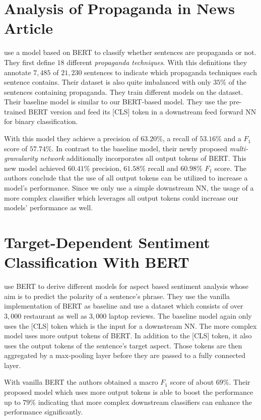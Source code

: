 \section{Analysis of Propaganda in News Article}
\Textcite{Martino:2019} use a model based on \ac{BERT} to classify whether sentences are propaganda or not.
They first define $18$ different \textit{propaganda techniques}.
With this definitions they annotate $7,485$ of $21,230$ sentences to indicate which propaganda techniques each sentence contains.
Their dataset is also quite imbalanced with only $35\%$ of the sentences containing propaganda.
They train different models on the dataset.
Their baseline model is similar to our \ac{BERT}-based model.
They use the pre-trained \ac{BERT} version and feed its [CLS] token in a downstream feed forward \ac{NN} for binary classification.

With this model they achieve a precision of $63.20\%$, a recall of $53.16\%$ and a $F_1$ score of $57.74\%$.
In contrast to the baseline model, their newly proposed \textit{multi-granularity network} additionally incorporates all output tokens of \ac{BERT}.
This new model achieved $60.41\%$ precision, $61.58\%$ recall and $60.98\%$ $F_1$ score.
The authors conclude that the use of all output tokens can be utilized to increase a model's performance.
Since we only use a simple downstream \ac{NN}, the usage of a more complex classifier which leverages all output tokens could increase our models' performance as well.

\section[Target-Dependent Sentiment Classification With BERT]{Target-Dependent Sentiment Classification With \ac{BERT}}
\Textcite{Gao:2019} use \ac{BERT} to derive different models for aspect based sentiment analysis whose aim is to predict the polarity of a sentence's phrase.
They use the vanilla implementation of \ac{BERT} as baseline and use a dataset which consists of over $3,000$ restaurant as well as $3,000$ laptop reviews.
The baseline model again only uses the [CLS] token which is the input for a downstream \ac{NN}.
The more complex model uses more output tokens of \ac{BERT}.
In addition to the [CLS] token, it also uses the output tokens of the sentence's target aspect.
Those tokens are then aggregated by a max-pooling layer before they are passed to a fully connected layer.

With vanilla \ac{BERT} the authors obtained a macro $F_1$ score of about $69\%$.
Their proposed model which uses more output tokens is able to boost the performance up to $79\%$ indicating that more complex downstream classifiers can enhance the performance significantly.

